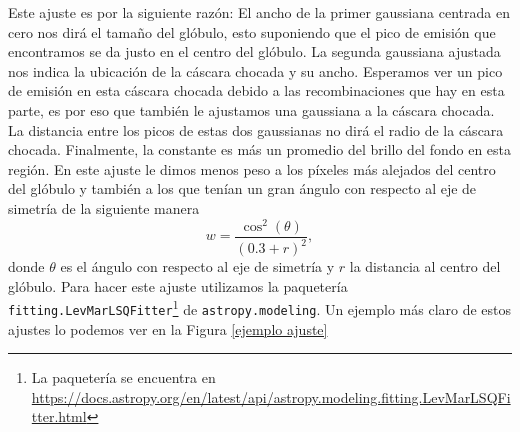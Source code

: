 \documentclass{book}
\begin{document}
Este ajuste es por la siguiente razón: El ancho de la primer gaussiana centrada en cero nos dirá el tamaño del glóbulo, esto suponiendo que el pico de emisión que encontramos se da justo en el centro del glóbulo. La segunda gaussiana ajustada nos indica la ubicación de la cáscara chocada y su ancho. Esperamos ver un pico de emisión en esta cáscara chocada debido a las recombinaciones que hay en esta parte, es por eso que también le ajustamos una gaussiana a la cáscara chocada. La distancia entre los picos de estas dos gaussianas no dirá el radio de la cáscara chocada. Finalmente, la constante es más un promedio del brillo del fondo en esta región. En este ajuste le dimos menos peso a los píxeles más alejados del centro del glóbulo y también a los que tenían un gran ángulo con respecto al eje de simetría de la siguiente manera
\begin{equation}\label{eq: peso}
    w = \frac{\cos^2(\theta)}{(0.3+r)^2},
\end{equation}
donde $\theta$ es el ángulo con respecto al eje de simetría y $r$ la distancia al centro del glóbulo. Para hacer este ajuste utilizamos la paquetería   \verb|fitting.LevMarLSQFitter|\footnote{La paquetería se encuentra en \url{https://docs.astropy.org/en/latest/api/astropy.modeling.fitting.LevMarLSQFitter.html}} de \verb|astropy.modeling|.
Un ejemplo más claro de estos ajustes lo podemos ver en la Figura \ref{ejemplo ajuste}
\end{document}
